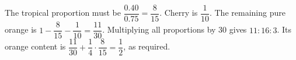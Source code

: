 The tropical proportion must be $\dfrac{0.40}{0.75}=\dfrac{8}{15}$. Cherry is $\dfrac{1}{10}$. The remaining pure orange is $1-\dfrac{8}{15}-\dfrac{1}{10}=\dfrac{11}{30}$. Multiplying all proportions by 30 gives $\boxed{11:16:3}$. Its orange content is $\dfrac{11}{30}+\dfrac{1}{4}\cdot\dfrac{8}{15}=\dfrac{1}{2}$, as required.
